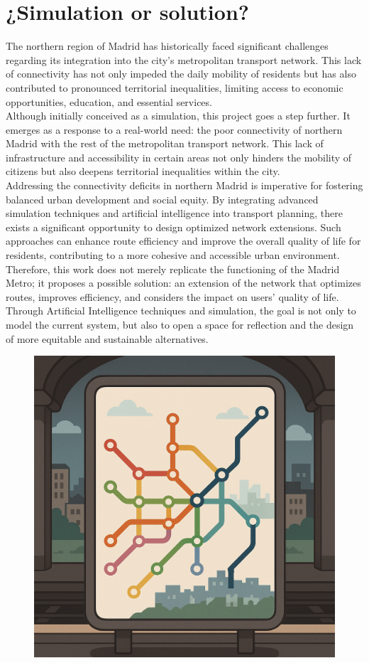 \documentclass[a4paper,11pt,oneside]{book}
\begin{document}
    \chapter*{\centering \Large ¿Simulation or solution?}


The northern region of Madrid has historically faced significant challenges regarding its integration into the city's metropolitan transport network. This lack of connectivity has not only impeded the daily mobility of residents but has also contributed to pronounced territorial inequalities, limiting access to economic opportunities, education, and essential services.
~\\[0,5cm]
Although initially conceived as a simulation, this project goes a step further. It emerges as a response to a real-world need: the poor connectivity of northern Madrid with the rest of the metropolitan transport network. This lack of infrastructure and accessibility in certain areas not only hinders the mobility of citizens but also deepens territorial inequalities within the city.
~\\[0,5cm]
Addressing the connectivity deficits in northern Madrid is imperative for fostering balanced urban development and social equity. By integrating advanced simulation techniques and artificial intelligence into transport planning, there exists a significant opportunity to design optimized network extensions. Such approaches can enhance route efficiency and improve the overall quality of life for residents, contributing to a more cohesive and accessible urban environment.
~\\[0,5cm]
Therefore, this work does not merely replicate the functioning of the Madrid Metro; it proposes a possible solution: an extension of the network that optimizes routes, improves efficiency, and considers the impact on users' quality of life. Through Artificial Intelligence techniques and simulation, the goal is not only to model the current system, but also to open a space for reflection and the design of more equitable and sustainable alternatives.
\begin{figure}
        \centering
        \vspace{-20 cm} 
        \includegraphics[width=0.49
        \linewidth]{image.png}
    \end{figure}
\end{document}
